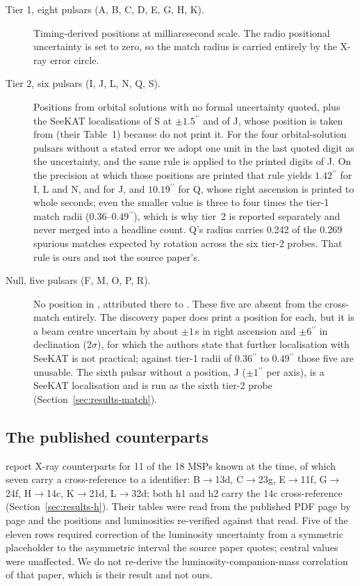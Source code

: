 \documentclass[11pt]{article}
\newcommand{\as}{\ensuremath{^{\prime\prime}}}
\begin{document}
\begin{description}
\item[Tier 1, eight pulsars (A, B, C, D, E, G, H, K).] Timing-derived positions at milliarcsecond scale. The radio positional uncertainty is set to zero, so the match radius is carried entirely by the X-ray error circle.
\item[Tier 2, six pulsars (I, J, L, N, Q, S).] Positions from orbital solutions with no formal uncertainty quoted, plus the SeeKAT localisations of S at $\pm1.5\as$ and of J, whose position is taken from \citet{Chen2023} (their Table~1) because \citet{ColomiBernadich2026} do not print it. For the four orbital-solution pulsars without a stated error we adopt one unit in the last quoted digit as the uncertainty, and the same rule is applied to the printed digits of J. On the precision at which those positions are printed that rule yields $1.42\as$ for I, L and N, and for J, and $10.19\as$ for Q, whose right ascension is printed to whole seconds; even the smaller value is three to four times the tier-1 match radii ($0.36$--$0.49\as$), which is why tier~2 is reported separately and never merged into a headline count. Q's radius carries 0.242 of the 0.269 spurious matches expected by rotation across the six tier-2 probes. That rule is ours and not the source paper's.
\item[Null, five pulsars (F, M, O, P, R).] No position in \citet{ColomiBernadich2026}, attributed there to \citet{Chen2023}. These five are absent from the cross-match entirely. The discovery paper does print a position for each, but it is a beam centre uncertain by about $\pm1$\,s in right ascension and $\pm6\as$ in declination (2$\sigma$), for which the authors state that further localisation with SeeKAT is not practical; against tier-1 radii of $0.36\as$ to $0.49\as$ those five are unusable. The sixth pulsar without a \citet{ColomiBernadich2026} position, J ($\pm1\as$ per axis), is a SeeKAT localisation and is run as the sixth tier-2 probe (Section~\ref{sec:results-match}).
\end{description}

\subsection{The published counterparts}
\label{sec:data-counterparts}

\citet{ZhaoHeinke2023} report X-ray counterparts for 11 of the 18 MSPs known at the time, of which seven carry a cross-reference to a \citet{Henleywillis2018} identifier: B$\to$13d, C$\to$23g, E$\to$11f, G$\to$24f, H$\to$14c, K$\to$21d, L$\to$32d; both h1 and h2 carry the 14c cross-reference (Section~\ref{sec:results-h}). Their tables were read from the published PDF page by page and the positions and luminosities re-verified against that read. Five of the eleven rows required correction of the luminosity uncertainty from a symmetric placeholder to the asymmetric interval the source paper quotes; central values were unaffected. We do not re-derive the luminosity-companion-mass correlation of that paper, which is their result and not ours.
\end{document}
